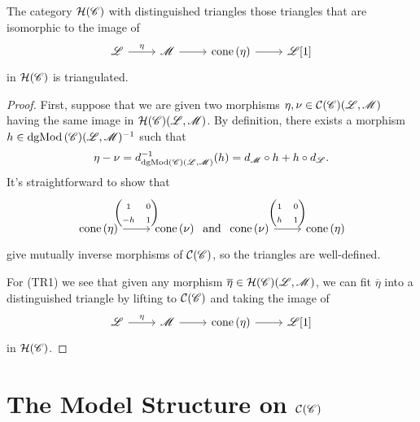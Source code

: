\documentclass[dissertation.tex]{subfiles}
\begin{document}
\begin{prop}
  The category $\mathcal{H}(\mathscr{C})$ with distinguished triangles those triangles that are isomorphic to the image of
  $$\begin{tikzcd}
    \mathscr{L} \arrow{r}{\eta} & \mathscr{M} \arrow{r} & \cone{\eta} \arrow{r} & \mathscr{L}[1] 
  \end{tikzcd}$$
  in $\mathcal{H}(\mathscr{C})$ is triangulated.

  \begin{proof}
    First, suppose that we are given two morphisms $\eta, \nu \in \mathcal{C}(\mathscr{C})(\mathscr{L},\mathscr{M})$ having the same image in $\mathcal{H}(\mathscr{C})(\mathscr{L},\mathscr{M})$.
    By definition, there exists a morphism $h \in \operatorname{dgMod\left(\mathscr{C}\right)}(\mathscr{L},\mathscr{M})^{-1}$ such that 
    $$\eta - \nu = d_{\operatorname{dgMod\left(\mathscr{C}\right)}(\mathscr{L},\mathscr{M})}^{-1}(h) = d_\mathscr{M} \circ h + h \circ d_\mathscr{L}.$$
    It's straightforward to show that
    $$\begin{tikzcd}[ampersand replacement=\&]
      \cone{\eta} \arrow{r}{\left(\begin{matrix}1 & 0\\-h & 1\end{matrix}\right)} \& \cone{\nu}
    \end{tikzcd}
    \ \text{and}\ 
    \begin{tikzcd}[ampersand replacement=\&]
      \cone{\nu} \arrow{r}{\left(\begin{matrix}1 & 0\\h & 1\end{matrix}\right)} \& \cone{\eta}
    \end{tikzcd}$$
    give mutually inverse morphisms of $\mathcal{C}(\mathscr{C})$, so the triangles are well-defined.
    
    For (TR1) we see that given any morphism $\overline{\eta} \in \mathcal{H}(\mathscr{C})(\mathscr{L},\mathscr{M})$, we can fit $\overline{\eta}$ into a distinguished triangle by lifting to $\mathcal{C}(\mathscr{C})$ and taking the image of
    $$\begin{tikzcd}
      \mathscr{L} \arrow{r}{\eta} & \mathscr{M} \arrow{r} & \cone{\eta} \arrow{r} & \mathscr{L}[1]
    \end{tikzcd}$$
    in $\mathcal{H}(\mathscr{C})$.
  \end{proof}
\end{prop}
\section{The Model Structure on $\mathcal{C}(\mathscr{C})$}
\end{document}
